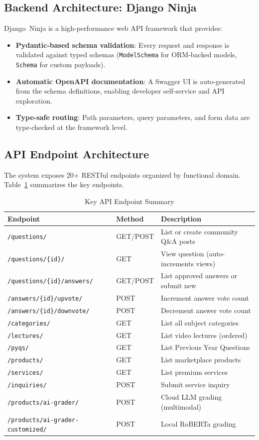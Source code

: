 \documentclass[conference]{IEEEtran}
\begin{document}
\subsection{Backend Architecture: Django Ninja}
Django~Ninja is a high-performance web API framework that provides:
\begin{itemize}[leftmargin=*]
    \item \textbf{Pydantic-based schema validation}: Every request and response is validated against typed schemas (\texttt{ModelSchema} for ORM-backed models, \texttt{Schema} for custom payloads).
    \item \textbf{Automatic OpenAPI documentation}: A Swagger UI is auto-generated from the schema definitions, enabling developer self-service and API exploration.
    \item \textbf{Type-safe routing}: Path parameters, query parameters, and form data are type-checked at the framework level.
\end{itemize}

\subsection{API Endpoint Architecture}
The system exposes 20+ RESTful endpoints organized by functional domain. Table~\ref{tab:endpoints} summarizes the key endpoints.

\begin{table}[t]
\caption{Key API Endpoint Summary}
\label{tab:endpoints}
\begin{center}
\begin{tabular}{llp{6cm}}
\toprule
\textbf{Endpoint} & \textbf{Method} & \textbf{Description} \\
\midrule
\texttt{/questions/} & GET/POST & List or create community Q\&A posts \\
\texttt{/questions/\{id\}/} & GET & View question (auto-increments views) \\
\texttt{/questions/\{id\}/answers/} & GET/POST & List approved answers or submit new \\
\texttt{/answers/\{id\}/upvote/} & POST & Increment answer vote count \\
\texttt{/answers/\{id\}/downvote/} & POST & Decrement answer vote count \\
\texttt{/categories/} & GET & List all subject categories \\
\texttt{/lectures/} & GET & List video lectures (ordered) \\
\texttt{/pyqs/} & GET & List Previous Year Questions \\
\texttt{/products/} & GET & List marketplace products \\
\texttt{/services/} & GET & List premium services \\
\texttt{/inquiries/} & POST & Submit service inquiry \\
\texttt{/products/ai-grader/} & POST & Cloud LLM grading (multimodal) \\
\texttt{/products/ai-grader-customized/} & POST & Local RoBERTa grading \\
\bottomrule
\end{tabular}
\end{center}
\end{table}
\end{document}
